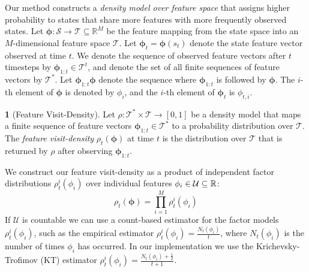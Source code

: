 \documentclass{article}
\theoremstyle{definition}
\newtheorem{defn}{\protect\definitionname}
\theoremstyle{definition}
\theoremstyle{plain}
\theoremstyle{plain}
\theoremstyle{plain}
\providecommand{\definitionname}{Definition}
\begin{document}
Our method constructs a \emph{density model over feature space }that
assigns higher probability to states that share more features with
more frequently observed states. Let $\bm{\phi}:\mathcal{S}\to\mathcal{T}\subseteq\mathbb{R}^{M}$
be the feature mapping from the state space into an $M$-dimensional
feature space $\mathcal{T}$. Let $\bm{\phi}_{t}=\bm{\phi}(s_{t})$
denote the state feature vector observed at time $t$. We denote the
sequence of observed feature vectors after $t$ timesteps by $\bm{\phi}_{1:t}\in\mathcal{T}^{t}$,
and denote the set of all finite sequences of feature vectors by $\mathcal{T}^{*}$.
Let $\bm{\phi}_{1:t}\bm{\phi}$ denote the sequence where $\bm{\phi}_{1:t}$
is followed by $\bm{\phi}$. The $i$-th element of $\bm{\phi}$ is
denoted by $\phi_{i}$, and the $i$-th element of $\bm{\phi}_{t}$
is $\phi_{t,i}$. 
\begin{defn}
[Feature Visit-Density]Let $\rho:\mathcal{T}^{*}\times\mathcal{T}\to[0,1]$
be a density model\emph{ }that maps a finite sequence of feature vectors
$\bm{\phi}_{1:t}\in\mathcal{T}^{*}$ to a probability distribution
over $\mathcal{T}$. The \emph{feature visit-density }$\rho_{t}(\bm{\phi})$
at time $t$ is the distribution over $\mathcal{T}$ that is returned
by $\rho$ after observing $\bm{\phi}_{1:t}$. 
\end{defn}
We construct our\emph{ }feature visit-density\emph{ }as a product
of independent factor distributions $\rho_{t}^{i}(\phi_{i})$ over
individual features $\phi_{i}\in\mbox{\ensuremath{\mathcal{U}\subseteq\mathbb{R}}}$:
\[
\rho_{t}(\bm{\phi})=\prod_{i=1}^{M}\rho_{t}^{i}(\phi_{i})
\]
If $\mathcal{U}$ is countable we can use a count-based estimator
for the factor models $\rho_{t}^{i}(\phi_{i})$, such as the empirical
estimator $\rho_{t}^{i}(\phi_{i})=\frac{N_{t}(\phi_{i})}{t}$, where
$N_{t}(\phi_{i})$ is the number of times $\phi_{i}$ has occurred.
In our implementation we use the Krichevsky-Trofimov (KT) estimator
$\rho_{t}^{i}(\phi_{i})=\frac{N_{t}(\phi_{i})+\frac{1}{2}}{t+1}$.
\end{document}
